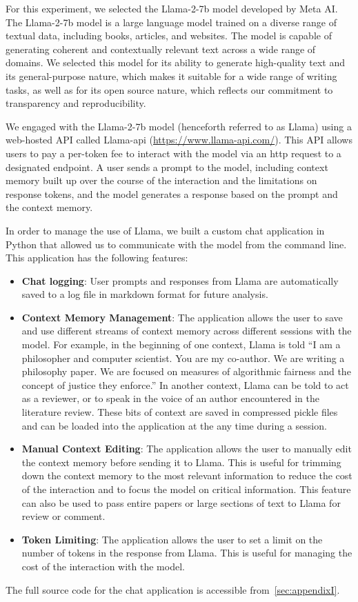 For this experiment, we selected the Llama-2-7b model developed by Meta AI. The
Llama-2-7b model is a large language model trained on a diverse range of
textual data, including books, articles, and websites. The model is capable of
generating coherent and contextually relevant text across a wide range of
domains. We selected this model for its ability to generate high-quality text
and its general-purpose nature, which makes it suitable for a wide range of
writing tasks, as well as for its open source nature, which reflects our
commitment to transparency and reproducibility.

We engaged with the Llama-2-7b model (henceforth referred to as Llama) using a
web-hosted API called Llama-api (\url{https://www.llama-api.com/}). This API
allows users to pay a per-token fee to interact with the model via an http
request to a designated endpoint. A user sends a prompt to the model, including
context memory built up over the course of the interaction and the limitations
on response tokens, and the model generates a response based on the prompt and
the context memory.

In order to manage the use of Llama, we built a custom chat application in
Python that allowed us to communicate with the model from the command line.
This application has the following features:
\begin{itemize}
    \item \textbf{Chat logging}: User prompts and responses from Llama are
    automatically saved to a log file in markdown format for future analysis.
    \item \textbf{Context Memory Management}: The application allows the user
    to save and use different streams of context memory across different
    sessions with the model. For example, in the beginning of one context, Llama
    is told ``I am a philosopher and computer scientist. You are my co-author.
    We are writing a philosophy paper. We are focused on measures of algorithmic
    fairness and the concept of justice they enforce.'' In another context,
    Llama can be told to act as a reviewer, or to speak in the voice of an
    author encountered in the literature review. These bits of context are saved
    in compressed pickle files and can be loaded into the application at the
    any time during a session.
    \item \textbf{Manual Context Editing}: The application allows the user to
    manually edit the context memory before sending it to Llama. This is useful
    for trimming down the context memory to the most relevant information to
    reduce the cost of the interaction and to focus the model on critical
    information. This feature can also be used to pass entire papers or large
    sections of text to Llama for review or comment.
    \item \textbf{Token Limiting}: The application allows the user to set a
    limit on the number of tokens in the response from Llama. This is useful for
    managing the cost of the interaction with the model.
\end{itemize}
The full source code for the chat application is accessible
from~\ref{sec:appendixI}.

